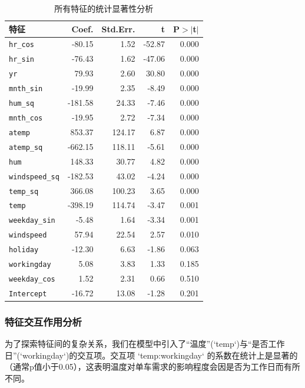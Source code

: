\documentclass[UTF8,a4paper,10pt]{ctexart}
\begin{document}
\begin{table}[H]
    \centering
    \caption{所有特征的统计显著性分析}
    \begin{tabular}{lrrrr}
        \toprule
        \textbf{特征} & \textbf{Coef.} & \textbf{Std.Err.} & \textbf{t} & \textbf{P$> |$t$|$} \\
        \midrule
        \texttt{hr\_cos} & -80.15 & 1.52 & -52.87 & 0.000 \\
        \texttt{hr\_sin} & -76.43 & 1.62 & -47.06 & 0.000 \\
        \texttt{yr} & 79.93 & 2.60 & 30.80 & 0.000 \\
        \texttt{mnth\_sin} & -19.99 & 2.35 & -8.49 & 0.000 \\
        \texttt{hum\_sq} & -181.58 & 24.33 & -7.46 & 0.000 \\
        \texttt{mnth\_cos} & -19.95 & 2.72 & -7.34 & 0.000 \\
        \texttt{atemp} & 853.37 & 124.17 & 6.87 & 0.000 \\
        \texttt{atemp\_sq} & -662.15 & 118.11 & -5.61 & 0.000 \\
        \texttt{hum} & 148.33 & 30.77 & 4.82 & 0.000 \\
        \texttt{windspeed\_sq} & -182.53 & 43.02 & -4.24 & 0.000 \\
        \texttt{temp\_sq} & 366.08 & 100.23 & 3.65 & 0.000 \\
        \texttt{temp} & -398.19 & 114.74 & -3.47 & 0.001 \\
        \texttt{weekday\_sin} & -5.48 & 1.64 & -3.34 & 0.001 \\
        \texttt{windspeed} & 57.94 & 22.54 & 2.57 & 0.010 \\
        \texttt{holiday} & -12.30 & 6.63 & -1.86 & 0.063 \\
        \texttt{workingday} & 5.08 & 3.83 & 1.33 & 0.185 \\
        \texttt{weekday\_cos} & 1.52 & 2.31 & 0.66 & 0.510 \\
        \texttt{Intercept} & -16.72 & 13.08 & -1.28 & 0.201 \\
        \bottomrule
    \end{tabular}
\end{table}

\subsubsection{特征交互作用分析}
为了探索特征间的复杂关系，我们在模型中引入了“温度”(`temp`)与“是否工作日”(`workingday`)的交互项。交互项 `temp:workingday` 的系数在统计上是显著的（通常p值小于0.05），这表明温度对单车需求的影响程度会因是否为工作日而有所不同。
\end{document}
